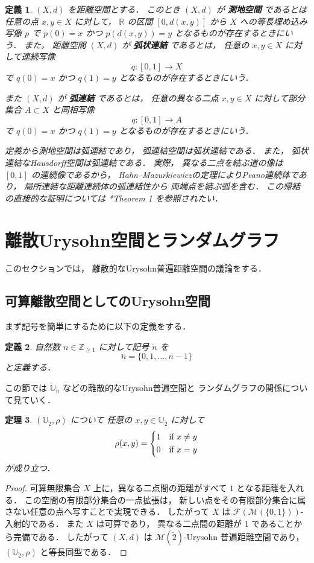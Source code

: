 \documentclass[leqno, 12pt]{jsarticle}
\newtheorem{thm}{定理}[section]
\newtheorem{df}[thm]{定義}
\newcommand{\zz}{\mathbb{Z}}
\newcommand{\yozz}[1]{\zz_{\ge #1}}
\newcommand{\rr}{\mathbb{R}}
\newcommand{\Met}[1]{\mathscr{M}(#1)}
\newcommand{\FinitePart}[1]{\mathscr{F}(#1)}
\newcommand{\FinMet}[1]{\FinitePart{\Met{#1}}}
\newcommand{\Ury}{\mathbb{U}}
\newcommand{\UryOf}[1]{\Ury_{#1}}
\newcommand{\InitSeg}[1]{\breve{#1}}
\begin{document}
\begin{df}\label{df:pp:lengthspace}
$(X, d)$
を距離空間とする．
このとき
$(X, d)$
が
\textbf{測地空間}
であるとは
任意の点
$x, y\in X$
に対して，
$\rr$
の区間
$[0, d(x, y)]$
から
$X$
への等長埋め込み写像
$p$
で
$p(0)=x$
かつ
$p(d(x, y))=y$
となるものが存在するときにいう．
また，%
距離空間
$(X, d)$
が
\textbf{弧状連結}
であるとは，
任意の
$x,y\in X$
に対して連続写像
\[
q\colon[0,1]\longrightarrow X
\]
で
$q(0)=x$
かつ
$q(1)=y$
となるものが存在するときにいう．

また
$(X,d)$
が
\textbf{弧連結}
であるとは，
任意の異なる二点
$x,y\in X$
に対して部分集合
$A\subset X$
と同相写像
\[
q\colon[0,1]\longrightarrow A
\]
で
$q(0)=x$
かつ
$q(1)=y$
となるものが存在するときにいう．

定義から測地空間は弧連結であり，
弧連結空間は弧状連結である．
また，
弧状連結なHausdorff空間は弧連結である．
実際，
異なる二点を結ぶ道の像は
$[0,1]$
の連続像であるから，
Hahn--Mazurkiewiczの定理によりPeano連続体であり，
局所連結な距離連続体の弧連結性から
両端点を結ぶ弧を含む．
この帰結の直接的な証明については
\cite{BrazasArc}*{Theorem 1}
を参照されたい．
\end{df}




\newpage
\section{離散Urysohn空間とランダムグラフ}\label{sec:risan}
このセクションでは，
離散的なUrysohn普遍距離空間の議論をする．
\subsection{可算離散空間としてのUrysohn空間}\label{subsec:discrete:countable}
まず記号を簡単にするために以下の定義をする．
\begin{df}\label{df:rand:numb}
自然数
$n\in \yozz{1}$
に対して記号
$\InitSeg{n}$
を
\[
\InitSeg{n}=\{0, 1, \dots, n-1\}
\]
と定義する．
\end{df}
この節では
$\UryOf{\InitSeg{n}}$
などの離散的なUrysohn普遍空間と
ランダムグラフの関係について見ていく．


\begin{thm}\label{thm:rand:risan}
$(\UryOf{\InitSeg{2}}, \rho)$
について
任意の
$x,y\in\UryOf{\InitSeg{2}}$
に対して
\[
\rho(x, y)=
\begin{dcases}
1 & \text{if
$x\neq y$}\\
0 & \text{if
$x=y$}
\end{dcases}
\]
が成り立つ．
\end{thm}
\begin{proof}
可算無限集合
$X$
上に，異なる二点間の距離がすべて
$1$
となる距離を入れる．
この空間の有限部分集合の一点拡張は，
新しい点をその有限部分集合に属さない任意の点へ写すことで実現できる．
したがって
$X$
は
$\FinMet{\{0,1\}}$-入射的である．
また
$X$
は可算であり，
異なる二点間の距離が
$1$
であることから完備である．
したがって
$(X,d)$
は
$\Met{\InitSeg{2}}$-Urysohn
普遍距離空間であり，
$(\UryOf{\InitSeg{2}}, \rho)$%
と等長同型である．
\end{proof}
\end{document}
